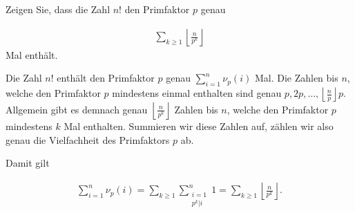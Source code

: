 
\begin{exercise}[Legendre]

Zeigen Sie, dass die Zahl $n!$ den Primfaktor $p$ genau

\begin{align*}
  \sum_{k \geq 1} \left\lfloor \frac{n}{p^k}\right\rfloor
\end{align*}
Mal enthält.
\end{exercise}


\begin{solution}

Die Zahl $n!$ enthält den Primfaktor $p$ genau $\sum_{i=1}^n \nu_p(i)$ Mal.
Die Zahlen bis $n$, welche den Primfaktor $p$ mindestens einmal enthalten sind genau
$p,2p,\dots,\left\lfloor \frac{n}{p}\right\rfloor p$.
Allgemein gibt es demnach genau $\left\lfloor \frac{n}{p^k}\right\rfloor$ Zahlen bis $n$,
welche den Primfaktor $p$ mindestens $k$ Mal enthalten.
Summieren wir diese Zahlen auf, zählen wir also genau die Vielfachheit
des Primfaktors $p$ ab.

Damit gilt

\begin{align*}
  \sum_{i=1}^n \nu_p(i) = \sum_{k \geq 1}\sum_{\substack{i=1 \\ p^k | i}}^n 1
  = \sum_{k \geq 1} \left\lfloor \frac{n}{p^k}\right\rfloor.
\end{align*}

\end{solution}

